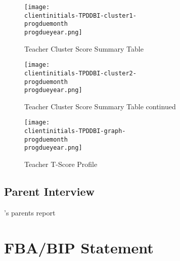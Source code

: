 \documentclass{article}
\def\clientfirstname{}
\def\progduemonth{}
\def\progdueyear{}
\def\clientinitials{}
\begin{document}
			\begin{figure}
				\begin{center}
				\texttt{[image: \\clientinitials-TPDDBI-cluster1-\\progduemonth\\progdueyear.png]}
				\caption{Teacher Cluster Score Summary Table}
				\label{fig:composite}
				\end{center}
			\end{figure}
			\vfill
			\clearpage

			\newpage
			\vfill
			\begin{figure}
			\begin{center}
				\texttt{[image: \\clientinitials-TPDDBI-cluster2-\\progduemonth\\progdueyear.png]}
				\caption{Teacher Cluster Score Summary Table continued}
			\end{center}
			\end{figure}
			\vfill
			\clearpage

			\newpage
			\vfill
			\begin{figure}
			\begin{center}
				\texttt{[image: \\clientinitials-TPDDBI-graph-\\progduemonth\\progdueyear.png]}
				\caption{Teacher T-Score Profile}
			\end{center}
			\end{figure}
			\vfill
			\clearpage

	\subsection{Parent Interview}
	\clientfirstname's parents report 

\section{FBA/BIP Statement}
\end{document}
